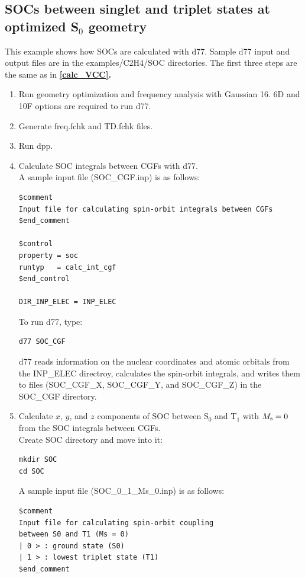 ﻿\documentclass[11pt,a4paper,openany]{article}
\begin{document}
\subsection{SOCs between singlet and triplet states at optimized S$_0$ geometry}
This example shows how SOCs are calculated with d77. Sample d77 input and output files are in the examples/C2H4/SOC directories. The first three steps are the same as in \bf{\ref{calc_VCC}}\rm{.}

\begin{enumerate}

\item{
Run geometry optimization and frequency analysis with Gaussian 16. 
6D and 10F options are required to run d77.
}
\item{Generate freq.fchk and TD.fchk files.}
\item{Run dpp.}

\item{
Calculate SOC integrals between CGFs with d77.\\
A sample input file (SOC\_CGF.inp) is as follows:
\begin{verbatim}
$comment
Input file for calculating spin-orbit integrals between CGFs
$end_comment

$control
property = soc
runtyp   = calc_int_cgf
$end_control

DIR_INP_ELEC = INP_ELEC
\end{verbatim}
To run d77, type:
\begin{verbatim} 
d77 SOC_CGF
\end{verbatim}
d77 reads information on the nuclear coordinates and atomic orbitals from \\
the INP\_ELEC directroy, calculates the spin-orbit integrals, 
and writes them to files (SOC\_CGF\_X, SOC\_CGF\_Y, and SOC\_CGF\_Z) in the SOC\_CGF directory.
}

\item{
Calculate $x$, $y$, and $z$ components of SOC between S$_0$ and T$_1$ 
with $M_{\rm{s}} = 0$ from the SOC integrals between CGFs.\\
Create SOC directory and move into it:
\begin{verbatim}
mkdir SOC
cd SOC
\end{verbatim} 
A sample input file (SOC\_0\_1\_Ms\_0.inp) is as follows:
\begin{verbatim} 
$comment
Input file for calculating spin-orbit coupling
between S0 and T1 (Ms = 0)
| 0 > : ground state (S0)
| 1 > : lowest triplet state (T1)
$end_comment


\end{verbatim}}
\end{enumerate}
\end{document}
